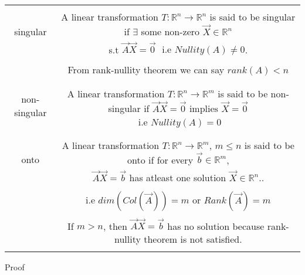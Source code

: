 \begin{table*}[!ht]
	\begin{center}
\resizebox{2\columnwidth}{!}
{
		\begin{tabular}{|c|c|}
			\hline
			\multirow{3}{*}{singular} &\\
			& A linear transformation $T : \mathbb{R}^{n} \rightarrow \mathbb{R}^{n}$ is said to be singular if $\exists$ some non-zero $\vec{X} \in \mathbb{R}^n$\\
			& s.t $\vec{A}\vec{X} = \vec{0}$ $\text{ i.e } Nullity(A) \neq 0$. \\
			& \\
			& From rank-nullity theorem we can say $rank(A)<n$\\
			& \\
			\hline
			\multirow{3}{*}{non-singular} & \\
			& A linear transformation $T : \mathbb{R}^{n} \rightarrow \mathbb{R}^{m}$ is said to be non-singular if $\vec{A}\vec{X} = \vec{0} \text{ implies } \vec{X} = \vec{0}$\\
			& $\text{ i.e } Nullity(A) = 0$\\
			& \\
			\hline			
			\multirow{3}{*}{onto} & \\
			& A linear transformation $T : \mathbb{R}^{n} \rightarrow \mathbb{R}^{m}$, $m\leq n$ is said to be onto if for every  $\vec{b} \in \mathbb{R}^{m}$,\\
			&  $\vec{A}\vec{X} =\vec{b}$ has atleast one solution $\vec{X} \in \mathbb{R}^{n}$..\\
			& \\
			& i.e $dim(Col(\vec{A})) = m$ or $Rank(\vec{A}) = m$\\
			& \\
			& If $m>n$, then $\vec{A}\vec{X}=\vec{b}$ has no solution because rank-nullity theorem is not satisfied.\\
			& \\
			\hline
		\end{tabular}
}
	\end{center}
\caption{}
\label{table:solutions/3/2/10/1}
\end{table*}
{Proof}
